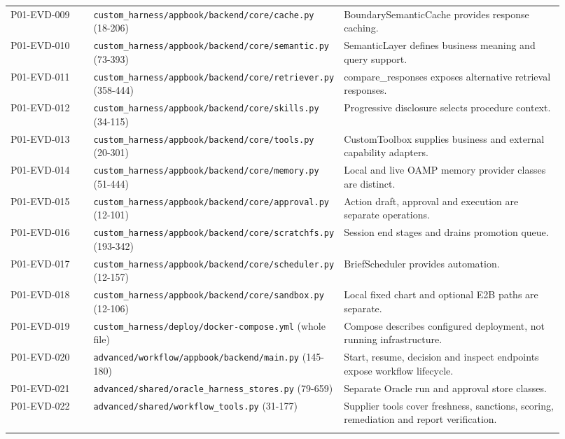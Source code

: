\documentclass[10pt,letterpaper]{article}
\begin{document}
\begin{longtable}{@{}>{\raggedright\arraybackslash}p{0.16\linewidth}>{\raggedright\arraybackslash}p{0.34\linewidth}>{\raggedright\arraybackslash}p{0.42\linewidth}@{}}
P01-EVD-009 & \nolinkurl{custom_harness/appbook/backend/core/cache.py} (18-206) & BoundarySemanticCache provides response caching.\\\addlinespace
P01-EVD-010 & \nolinkurl{custom_harness/appbook/backend/core/semantic.py} (73-393) & SemanticLayer defines business meaning and query support.\\\addlinespace
P01-EVD-011 & \nolinkurl{custom_harness/appbook/backend/core/retriever.py} (358-444) & compare\_responses exposes alternative retrieval responses.\\\addlinespace
P01-EVD-012 & \nolinkurl{custom_harness/appbook/backend/core/skills.py} (34-115) & Progressive disclosure selects procedure context.\\\addlinespace
P01-EVD-013 & \nolinkurl{custom_harness/appbook/backend/core/tools.py} (20-301) & CustomToolbox supplies business and external capability adapters.\\\addlinespace
P01-EVD-014 & \nolinkurl{custom_harness/appbook/backend/core/memory.py} (51-444) & Local and live OAMP memory provider classes are distinct.\\\addlinespace
P01-EVD-015 & \nolinkurl{custom_harness/appbook/backend/core/approval.py} (12-101) & Action draft, approval and execution are separate operations.\\\addlinespace
P01-EVD-016 & \nolinkurl{custom_harness/appbook/backend/core/scratchfs.py} (193-342) & Session end stages and drains promotion queue.\\\addlinespace
P01-EVD-017 & \nolinkurl{custom_harness/appbook/backend/core/scheduler.py} (12-157) & BriefScheduler provides automation.\\\addlinespace
P01-EVD-018 & \nolinkurl{custom_harness/appbook/backend/core/sandbox.py} (12-106) & Local fixed chart and optional E2B paths are separate.\\\addlinespace
P01-EVD-019 & \nolinkurl{custom_harness/deploy/docker-compose.yml} (whole file) & Compose describes configured deployment, not running infrastructure.\\\addlinespace
P01-EVD-020 & \nolinkurl{advanced/workflow/appbook/backend/main.py} (145-180) & Start, resume, decision and inspect endpoints expose workflow lifecycle.\\\addlinespace
P01-EVD-021 & \nolinkurl{advanced/shared/oracle_harness_stores.py} (79-659) & Separate Oracle run and approval store classes.\\\addlinespace
P01-EVD-022 & \nolinkurl{advanced/shared/workflow_tools.py} (31-177) & Supplier tools cover freshness, sanctions, scoring, remediation and report verification.\\\addlinespace

\end{longtable}
\end{document}
